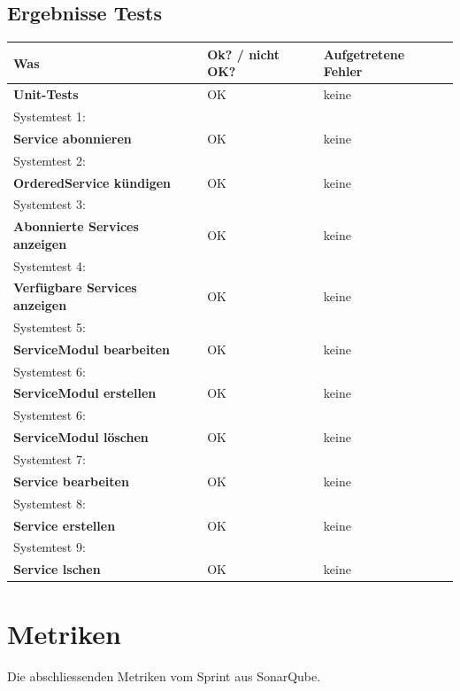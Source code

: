 \subsection{Ergebnisse Tests}
\begin{tabularx}{\linewidth}{X l l}
\textbf{Was} & \textbf{Ok? / nicht OK?} & \textbf{Aufgetretene Fehler}\\
\hline
\textbf{Unit-Tests} & {\color{green} OK}  & keine\\
\hline
Systemtest 1: & & \\
\textbf{Service abonnieren} & {\color{green} OK} & keine\\
\hline
Systemtest 2: & & \\
\textbf{OrderedService kündigen} & {\color{green} OK}  & keine\\
\hline
Systemtest 3: & & \\
\textbf{Abonnierte Services anzeigen} & {\color{green} OK}  & keine\\
\hline
Systemtest 4: & & \\
\textbf{Verfügbare Services anzeigen} & {\color{green} OK}  & keine\\
\hline
Systemtest 5: & & \\
\textbf{ServiceModul bearbeiten} & {\color{green} OK}  & keine\\
\hline
Systemtest 6: & & \\
\textbf{ServiceModul erstellen} & {\color{green} OK}  & keine\\
\hline
Systemtest 6: & & \\
\textbf{ServiceModul löschen} & {\color{green} OK}  & keine\\
\hline
Systemtest 7: & & \\
\textbf{Service bearbeiten} & {\color{green} OK}  & keine\\
\hline
Systemtest 8: & & \\
\textbf{Service erstellen} & {\color{green} OK}  & keine\\
\hline
Systemtest 9: & & \\
\textbf{Service lschen} & {\color{green} OK}  & keine\\
\hline


\end{tabularx}

\newpage

\section{Metriken}
Die abschliessenden Metriken vom Sprint aus SonarQube.
